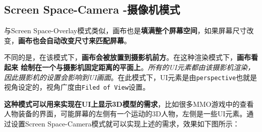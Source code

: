 \documentclass[UTF8,a4paper,12pt]{ctexbook}
\begin{document}
		\subsection{Screen Space-Camera -摄像机模式}
			与Screen Space-Overlay模式类似，画布也是\textbf{填满整个屏幕空间}，如果屏幕尺寸改变，\textbf{画布也会自动改变尺寸来匹配屏幕}。
			
			不同的是，在该模式下，\textbf{画布会被放置到摄影机前方}。在这种渲染模式下，\textbf{画布看起来 绘制在一个与摄影机固定距离的平面上}。\textit{所有的UI元素都由该摄影机渲染，因此摄影机的设置会影响到UI画面}。在此模式下，UI元素是由\verb|perspective|也就是视角设定的，视角广度由\verb|Filed of View|设置。
			
			\textbf{这种模式可以用来实现在UI上显示3D模型的需求}，比如很多MMO游戏中的查看人物装备的界面，可能屏幕的左侧有一个运动的3D人物，左侧是一些UI元素。通过设置Screen Space-Camera模式就可以实现上述的需求，效果如下图所示：
\end{document}
